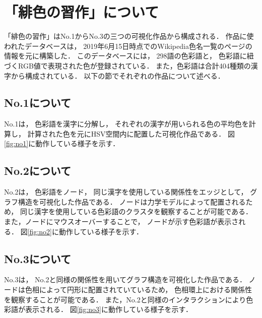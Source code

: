 \documentclass[a4j,twocolumn]{ujarticle} %
\newcommand{\workname}{緋色の習作}
\newcommand{\colorname}{色彩語}
\newcommand{\mysubsection}[1]{\vspace{-19pt}\subsection{#1}\vspace{-5pt}}
\newcommand{\myfigure}[3]{
\begin{figure}[htbp]
  \begin{center}
    \texttt{[image: \#1]}
    \caption{#2}
    \vspace{-2zh}
    \label{#3}
  \end{center}
\end{figure}
}
\begin{document}
\vspace{-3zh}

\section{「\workname{}」について}

「\workname{}」はNo.1からNo.3の三つの可視化作品から構成される．
作品に使われたデータベースは，
2019年6月15日時点でのWikipedia色名一覧のページ\cite{WikiColorName}の情報を元に構築した．
このデータベースには，
298語の\colorname{}と，
\colorname{}に紐づくRGB値で表現された色が登録されている．
また，\colorname{}は合計404種類の漢字から構成されている．
以下の節でそれぞれの作品について述べる．

\mysubsection{No.1について}

No.1は，
\colorname{}を漢字に分解し，
それぞれの漢字が用いられる色の平均色を計算し，
計算された色を元にHSV空間内に配置した可視化作品である．
図\ref{fig:no1}に動作している様子を示す．


\mysubsection{No.2について}

No.2は，
\colorname{}をノード，
同じ漢字を使用している関係性をエッジとして，
グラフ構造を可視化した作品である．
ノードは力学モデルによって配置されるため，
同じ漢字を使用している\colorname{}のクラスタを観察することが可能である．
また，ノードにマウスオーバーすることで，
ノードが示す\colorname{}が表示される．
図\ref{fig:no2}に動作している様子を示す．


\mysubsection{No.3について}

No.3は，
No.2と同様の関係性を用いてグラフ構造を可視化した作品である．
ノードは色相によって円形に配置されていているため，
色相環上における関係性を観察することが可能である．
また，No.2と同様のインタラクションにより\colorname{}が表示される．
図\ref{fig:no3}に動作している様子を示す．

\end{document}
